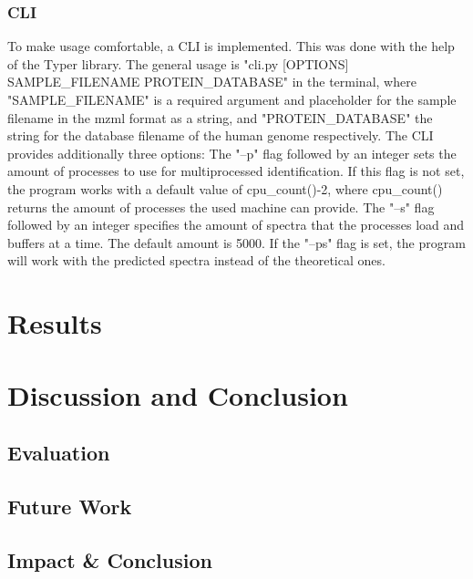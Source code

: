 \documentclass[11pt]{article}
\begin{document}
\subsubsection{CLI}
To make usage comfortable, a CLI is implemented. This was done with the help of the Typer library. The general usage is "cli.py [OPTIONS] SAMPLE\_FILENAME PROTEIN\_DATABASE" in the terminal, where "SAMPLE\_FILENAME" is a required argument and placeholder for the sample filename in the mzml format as a string, and "PROTEIN\_DATABASE" the string for the database filename of the human genome respectively. The CLI provides additionally three options: The "--p" flag followed by an integer sets the amount of processes to use for multiprocessed identification. If this flag is not set, the program works with a default value of cpu\_count()-2, where cpu\_count() returns the amount of processes the used machine can provide. The "--s" flag followed by an integer specifies the amount of spectra that the processes load and buffers at a time. The default amount is 5000. If the "--ps" flag is set, the program will work with the predicted spectra instead of the theoretical ones.


\section{Results}
\section{Discussion and Conclusion}
\subsection{Evaluation}
\subsection{Future Work}
\subsection{Impact \& Conclusion}


\printbibliography
\end{document}
